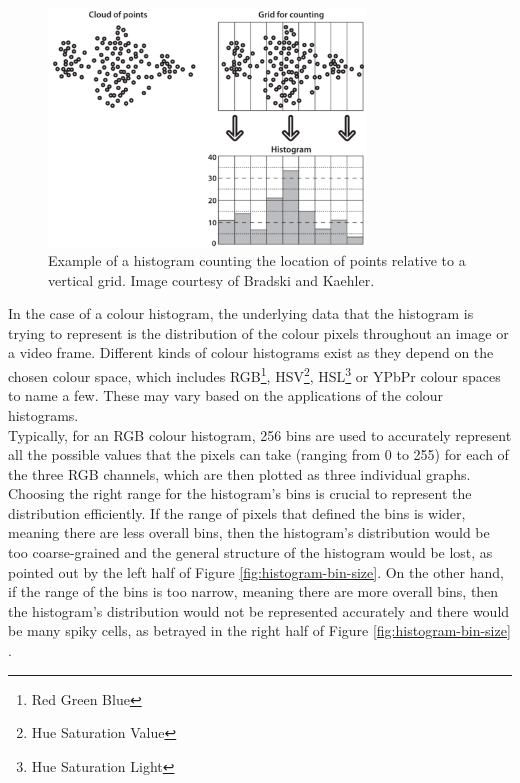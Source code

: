 \begin{figure}[h]
\centerline{\includegraphics[width=0.75\textwidth]{figures/litsurvey/histogram_general_example.png}}
\caption{\label{fig:histogram-general-example}Example of a histogram counting the location of points relative to a vertical grid. Image courtesy of Bradski and Kaehler.}
\end{figure}

In the case of a colour histogram, the underlying data that the histogram is trying to represent is the distribution of the colour pixels throughout an image or a video frame. Different kinds of colour histograms exist as they depend on the chosen colour space, which includes RGB\footnote{Red Green Blue}, HSV\footnote{Hue Saturation Value}, HSL\footnote{Hue Saturation Light} or YPbPr colour spaces to name a few. These may vary based on the applications of the colour histograms.\\

Typically, for an RGB colour histogram, 256 bins are used to accurately represent all the possible values that the pixels can take (ranging from 0 to 255) for each of the three RGB channels, which are then plotted as three individual graphs. Choosing the right range for the histogram's bins is crucial to represent the distribution efficiently. If the range of pixels that defined the bins is wider, meaning there are less overall bins, then the histogram's distribution would be too coarse-grained and the general structure of the histogram would be lost, as pointed out by the left half of Figure \ref{fig:histogram-bin-size}. On the other hand, if the range of the bins is too narrow, meaning there are more overall bins, then the histogram's distribution would not be represented accurately and there would be many spiky cells, as betrayed in the right half of Figure \ref{fig:histogram-bin-size} \cite{bradski2008opencv}.

